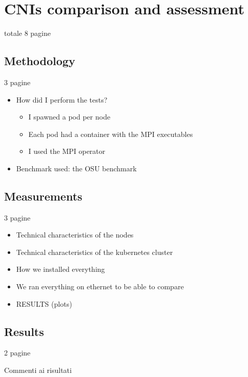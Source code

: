 \chapter{CNIs comparison and assessment}\label{chpt:osu}

totale 8 pagine


\section{Methodology}\label{sec:methodology}

3 pagine

\begin{itemize}
    \item How did I perform the tests?
    \begin{itemize}
        \item I spawned a pod per node
        \item Each pod had a container with the MPI executables
        \item I used the MPI operator
    \end{itemize}
    \item Benchmark used: the OSU benchmark
\end{itemize}

\section{Measurements}\label{sec:measurements}

3 pagine

\begin{itemize}
    \item Technical characteristics of the nodes
    \item Technical characteristics of the kubernetes cluster
    \item How we installed everything
    \item We ran everything on ethernet to be able to compare
    \item RESULTS (plots)
\end{itemize}



\section{Results}\label{sec:cniresuls}

2 pagine

Commenti ai risultati
